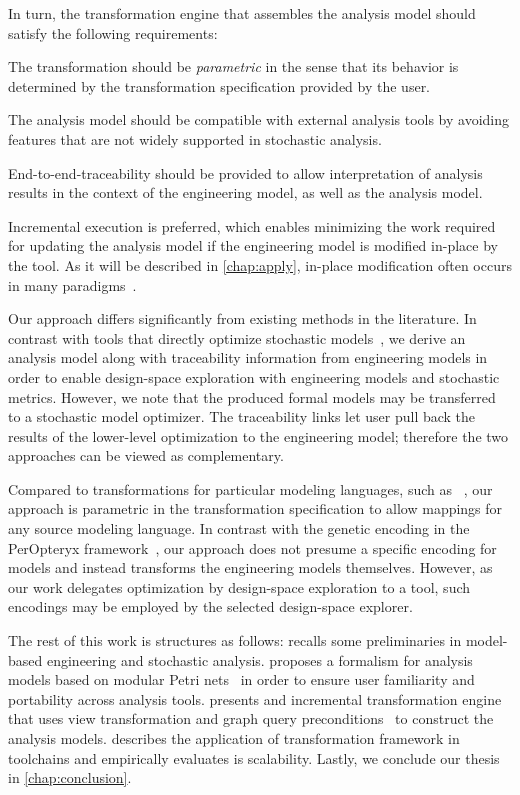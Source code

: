 In turn, the transformation engine that assembles the analysis model should satisfy the following requirements:
\begin{enumerate*}
\item The transformation should be \emph{parametric} in the sense that its behavior is determined by the transformation specification provided by the user.
\item The analysis model should be compatible with external analysis tools by avoiding features that are not widely supported in stochastic analysis.
\item End-to-end-traceability should be provided to allow interpretation of analysis results in the context of the engineering model, as well as the analysis model.
\item Incremental execution is preferred, which enables minimizing the work required for updating the analysis model if the engineering model is modified in-place by the  tool. As it will be described in \cref{chap:apply}, in-place modification often occurs in many  paradigms~\citep{Vanherpen14patterns}.
\end{enumerate*}

Our approach differs significantly from existing methods in the literature. In contrast with tools that directly optimize stochastic models~, we derive an analysis model along with traceability information from engineering models in order to enable design-space exploration with engineering models and stochastic metrics. However, we note that the produced formal models may be transferred to a stochastic model optimizer. The traceability links let user pull back the results of the lower-level optimization to the engineering model; therefore the two approaches can be viewed as complementary.

Compared to transformations for particular modeling languages, such as ~, our approach is parametric in the transformation specification to allow mappings for any source modeling language. In contrast with the genetic encoding in the PerOpteryx framework~\citep{Koziolek11generic}, our approach does not presume a specific encoding for models and instead transforms the engineering models themselves. However, as our work delegates optimization by design-space exploration to a  tool, such encodings may be employed by the selected design-space explorer.

The rest of this work is structures as follows:  recalls some preliminaries in model-based engineering and stochastic analysis.  proposes a formalism for analysis models based on modular Petri nets~\citep{Kindler09modular} in order to ensure user familiarity and portability across analysis tools.  presents and incremental transformation engine that uses view transformation and graph query preconditions~\citep{Debreceni14viewmodel} to construct the analysis models.  describes the application of transformation framework in  toolchains and empirically evaluates is scalability. Lastly, we conclude our thesis in \cref{chap:conclusion}.

